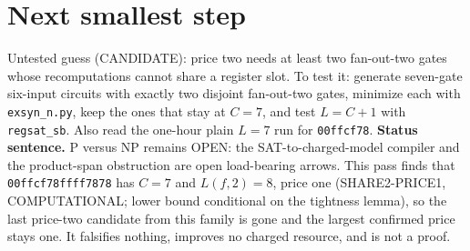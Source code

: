 \documentclass[11pt]{article}
\begin{document}
\section*{Next smallest step}
Untested guess (CANDIDATE): price two needs at least two fan-out-two gates whose recomputations cannot share a register slot. To test it: generate seven-gate six-input circuits with exactly two disjoint fan-out-two gates, minimize each with \texttt{exsyn\_n.py}, keep the ones that stay at $C=7$, and test $L=C+1$ with \texttt{regsat\_sb}. Also read the one-hour plain $L=7$ run for \texttt{00ffcf78}.
\bigskip
\noindent\textbf{Status sentence.} P versus NP remains OPEN: the SAT-to-charged-model compiler and the product-span obstruction are open load-bearing arrows. This pass finds that \texttt{00ffcf78ffff7878} has $C=7$ and $L(f,2)=8$, price one (SHARE2-PRICE1, COMPUTATIONAL; lower bound conditional on the tightness lemma), so the last price-two candidate from this family is gone and the largest confirmed price stays one. It falsifies nothing, improves no charged resource, and is not a proof.
\end{document}
